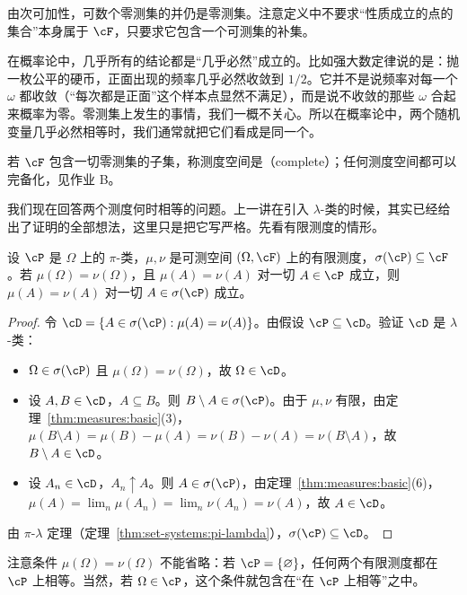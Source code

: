 由次可加性，可数个零测集的并仍是零测集。注意定义中不要求“性质成立的点的集合”本身属于 $\cF$，只要求它包含一个可测集的补集。

\begin{remark}
在概率论中，几乎所有的结论都是“几乎必然”成立的。比如强大数定律说的是：抛一枚公平的硬币，正面出现的频率几乎必然收敛到 $1/2$。它并不是说频率对每一个 $\omega$ 都收敛（“每次都是正面”这个样本点显然不满足），而是说不收敛的那些 $\omega$ 合起来概率为零。零测集上发生的事情，我们一概不关心。所以在概率论中，两个随机变量几乎必然相等时，我们通常就把它们看成是同一个。
\end{remark}

若 $\cF$ 包含一切零测集的子集，称测度空间是（complete）；任何测度空间都可以完备化，见作业 B。


我们现在回答两个测度何时相等的问题。上一讲在引入 $\lambda$-类的时候，其实已经给出了证明的全部想法，这里只是把它写严格。先看有限测度的情形。

\begin{theorem}[有限测度的唯一性]\label{thm:measures:uniqueness-finite}
设 $\cP$ 是 $\Omega$ 上的 $\pi$-类，$\mu,\nu$ 是可测空间 $(\Omega,\cF)$ 上的有限测度，$\sigma(\cP)\subseteq\cF$。若 $\mu(\Omega)=\nu(\Omega)$，且 $\mu(A)=\nu(A)$ 对一切 $A\in\cP$ 成立，则 $\mu(A)=\nu(A)$ 对一切 $A\in\sigma(\cP)$ 成立。
\end{theorem}
\begin{proof}
令 $\cD=\{A\in\sigma(\cP):\mu(A)=\nu(A)\}$。由假设 $\cP\subseteq\cD$。验证 $\cD$ 是 $\lambda$-类：
\begin{itemize}
\item $\Omega\in\sigma(\cP)$ 且 $\mu(\Omega)=\nu(\Omega)$，故 $\Omega\in\cD$。
\item 设 $A,B\in\cD$，$A\subseteq B$。则 $B\setminus A\in\sigma(\cP)$。由于 $\mu,\nu$ 有限，由定理~\ref{thm:measures:basic}(3)，$\mu(B\setminus A)=\mu(B)-\mu(A)=\nu(B)-\nu(A)=\nu(B\setminus A)$，故 $B\setminus A\in\cD$。
\item 设 $A_n\in\cD$，$A_n\uparrow A$。则 $A\in\sigma(\cP)$，由定理~\ref{thm:measures:basic}(6)，$\mu(A)=\lim_n\mu(A_n)=\lim_n\nu(A_n)=\nu(A)$，故 $A\in\cD$。
\end{itemize}
由 $\pi$-$\lambda$ 定理（定理~\ref{thm:set-systems:pi-lambda}），$\sigma(\cP)\subseteq\cD$。
\end{proof}

注意条件 $\mu(\Omega)=\nu(\Omega)$ 不能省略：若 $\cP=\{\varnothing\}$，任何两个有限测度都在 $\cP$ 上相等。当然，若 $\Omega\in\cP$，这个条件就包含在“在 $\cP$ 上相等”之中。

